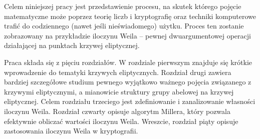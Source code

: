 Celem niniejszej pracy jest przedstawienie procesu,
na skutek którego pojęcie matematyczne
może poprzez teorię liczb i kryptografię oraz techniki komputerowe
trafić do codziennego (nawet jeśli nieświadomego) użytku.
Proces ten zostanie zobrazowany na przykładzie iloczynu Weila --
pewnej dwuargumentowej operacji
działającej na punktach krzywej eliptycznej.

Praca składa się z pięciu rozdziałów.
W rozdziale pierwszym znajduje się krótkie wprowadzenie
do tematyki krzywych eliptycznych.
Rozdział drugi zawiera bardziej szczegółowe studium
pewnego wyjątkowo ważnego pojęcia związanego z krzywymi eliptycznymi,
a mianowicie struktury grupy abelowej na krzywej eliptycznej.
Celem rozdziału trzeciego
jest zdefiniowanie i zanalizowanie własności iloczynu Weila.
Rozdział czwarty opisuje algorytm Millera,
który pozwala efektywnie obliczać wartości iloczynu Weila.
Wreszcie, rozdział piąty opisuje zastosowania iloczynu Weila w kryptografii.
